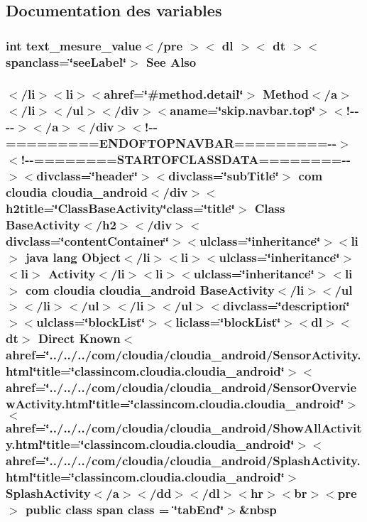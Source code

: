 \subsection{Documentation des variables}
\hypertarget{_base_activity_8html_a80d20105dcadc106a59e9ed0152e0caf}{
\subsubsection[{Also}]{\setlength{\rightskip}{0pt plus 5cm}int text\-\_\-mesure\-\_\-value$<$/pre $>$$<$ dl $>$$<$ {\bf dt} $>$$<$ spanclass=\char`\"{}see\-Label\char`\"{}$>$ See Also}}\label{_base_activity_8html_a80d20105dcadc106a59e9ed0152e0caf}
\hypertarget{_base_activity_8html_a406f8791460e5753ea2317e76ea0546e}{
\subsubsection[{class}]{\setlength{\rightskip}{0pt plus 5cm}$<$/li$>$$<$li$>$$<$ahref=\char`\"{}\#method.\-detail\char`\"{}$>$ Method$<$/{\bf a}$>$$<$/li$>$$<$/ul$>$$<$/div$>$$<$aname=\char`\"{}skip.\-navbar.\-top\char`\"{}$>$$<$!-\/-\/-\/-\/$>$$<$/a$>$$<$/div$>$$<$!-\/-\/=========E\-N\-D\-O\-F\-T\-O\-P\-N\-A\-V\-B\-A\-R=========-\/-\/$>$$<$!-\/-\/========S\-T\-A\-R\-T\-O\-F\-C\-L\-A\-S\-S\-D\-A\-T\-A========-\/-\/$>$$<$divclass=\char`\"{}header\char`\"{}$>$$<$divclass=\char`\"{}sub\-Title\char`\"{}$>$ com cloudia cloudia\-\_\-android$<$/div$>$$<$h2title=\char`\"{}Class\-Base\-Activity\char`\"{}class=\char`\"{}title\char`\"{}$>$ Class {\bf Base\-Activity}$<$/h2$>$$<$/div$>$$<$divclass=\char`\"{}content\-Container\char`\"{}$>$$<$ulclass=\char`\"{}inheritance\char`\"{}$>$$<$li$>$ java lang Object$<$/li$>$$<$li$>$$<$ulclass=\char`\"{}inheritance\char`\"{}$>$$<$li$>$ Activity$<$/li$>$$<$li$>$$<$ulclass=\char`\"{}inheritance\char`\"{}$>$$<$li$>$ com cloudia cloudia\-\_\-android {\bf Base\-Activity}$<$/li$>$$<$/ul$>$$<$/li$>$$<$/ul$>$$<$/li$>$$<$/ul$>$$<$divclass=\char`\"{}description\char`\"{}$>$$<$ulclass=\char`\"{}block\-List\char`\"{}$>$$<$liclass=\char`\"{}block\-List\char`\"{}$>$$<$dl$>$$<${\bf dt}$>$ Direct Known$<$ahref=\char`\"{}../../../com/cloudia/cloudia\-\_\-android/Sensor\-Activity.\-html\char`\"{}title=\char`\"{}classincom.\-cloudia.\-cloudia\-\_\-android\char`\"{}$>$$<$ahref=\char`\"{}../../../com/cloudia/cloudia\-\_\-android/Sensor\-Overview\-Activity.\-html\char`\"{}title=\char`\"{}classincom.\-cloudia.\-cloudia\-\_\-android\char`\"{}$>$$<$ahref=\char`\"{}../../../com/cloudia/cloudia\-\_\-android/Show\-All\-Activity.\-html\char`\"{}title=\char`\"{}classincom.\-cloudia.\-cloudia\-\_\-android\char`\"{}$>$$<$ahref=\char`\"{}../../../com/cloudia/cloudia\-\_\-android/Splash\-Activity.\-html\char`\"{}title=\char`\"{}classincom.\-cloudia.\-cloudia\-\_\-android\char`\"{}$>$ Splash\-Activity$<$/{\bf a}$>$$<$/{\bf dd}$>$$<$/dl$>$$<$hr$>$$<$br$>$$<$pre$>$ public class {\bf span} class = \char`\"{}tab\-End\char`\"{}$>$\&nbsp}}\label{_base_activity_8html_a406f8791460e5753ea2317e76ea0546e}
